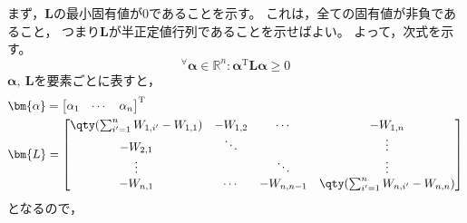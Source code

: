 \documentclass[class=jsarticle, crop=false, dvipdfmx, fleqn]{standalone}
\begin{document}
まず，\(\bm{L}\)の最小固有値が\(0\)であることを示す。
これは，全ての固有値が非負であること，
つまり\(\bm{L}\)が半正定値行列であることを示せばよい。
よって，次式を示す。
\begin{equation}
    {}^\forall \bm{\alpha} \in \mathbb{R}^{n}: 
        \bm{\alpha}^\mathrm{T} \bm{L} \bm{\alpha} \ge 0
\end{equation}
\(\bm{\alpha},\ \bm{L}\)を要素ごとに表すと，
\begin{align}
    & \bm{\alpha} =
        \begin{bmatrix}
            \alpha_1 & \cdots & \alpha_n
        \end{bmatrix}^\mathrm{T}
    \\
    & \bm{L} =
        \begin{bmatrix}
            \qty(\sum_{i'=1}^{n} W_{1, i'} - W_{1, 1}) & -W_{1, 2} & \cdots & -W_{1, n} \\
            -W_{2, 1} & \ddots & & \vdots \\
            \vdots & & \ddots & \vdots \\
            -W_{n, 1} & \cdots & -W_{n, n-1} & \qty(\sum_{i'=1}^{n} W_{n, i'} - W_{n, n})
        \end{bmatrix}
\end{align}
となるので，
\end{document}
